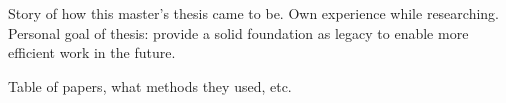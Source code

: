 \startsection[title=Author's remarks]

    Story of how this master's thesis came to be. Own experience while
    researching. Personal goal of thesis: provide a solid foundation as legacy
    to enable more efficient work in the future.

\stopsection


\startsection[title=Microwave Radiometer Retrieval Literature]

    Table of papers, what methods they used, etc.

\stopsection
